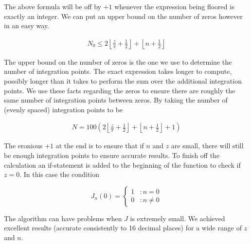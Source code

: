 \documentclass[onecolumn, groupedaddress, 10pt]{revtex4-1}
\begin{document}
The above formula will be off by $+1$ whenever the expression being floored is exactly an integer.  We can put an upper bound on the number of zeros however in an easy way.

\begin{align}
N_0 \leq 2 \left\lfloor \frac{z}{\pi} + \frac{1}{2} \right\rfloor + \left\lfloor n + \frac{1}{2} \right\rfloor
\end{align}

The upper bound on the number of zeros is the one we use to determine the number of integration points.  The exact expression takes longer to compute, possibly longer than it takes to perform the sum over the additional integration points.  We use these facts regarding the zeros to ensure there are roughly the same number of integration points between zeros.  By taking the number of (evenly spaced) integration points to be

\begin{align}
\label{eqn:dynamicIntegrationPoints}
N = 100 \left( 2 \left\lfloor \frac{z}{\pi} + \frac{1}{2} \right\rfloor + \left\lfloor n + \frac{1}{2} \right\rfloor + 1 \right)
\end{align}

The eronious $+1$ at the end is to ensure that if $n$ and $z$ are small, there will still be enough integration points to ensure accurate results.
To finish off the calculation an if-statement is added to the beginning of the function to check if $z=0$.  In this case the condition

\begin{displaymath}
   J_n(0) = \left\{
     \begin{array}{lr}
       1 & : n = 0     \\
       0 & : n \neq 0
     \end{array}
   \right.
\end{displaymath}

The algorithm can have problems when $J$ is extremely small.  We achieved excellent results (accurate consistently to 16 decimal places) for a wide range of $z$ and $n$.







\end{document}
